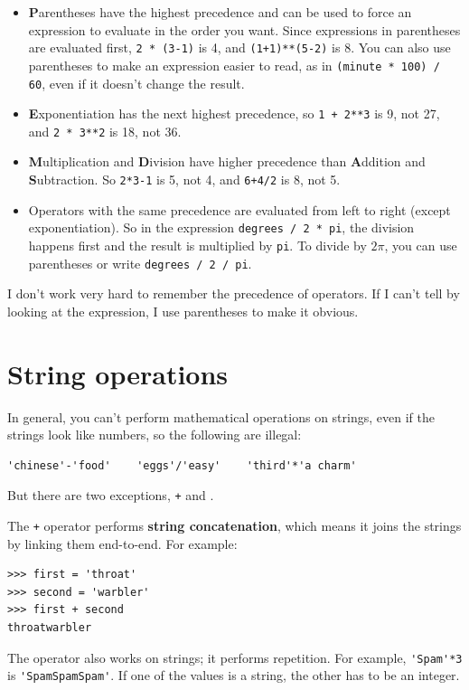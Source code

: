 \documentclass[10pt]{book}
\begin{document}
\begin{itemize}

\item {\bf P}arentheses have the highest precedence and can be used 
to force an expression to evaluate in the order you want. Since
expressions in parentheses are evaluated first, {\tt 2 * (3-1)} is 4,
and {\tt (1+1)**(5-2)} is 8. You can also use parentheses to make an
expression easier to read, as in {\tt (minute * 100) / 60}, even
if it doesn't change the result.

\item {\bf E}xponentiation has the next highest precedence, so
{\tt 1 + 2**3} is 9, not 27, and {\tt 2 * 3**2} is 18, not 36.

\item {\bf M}ultiplication and {\bf D}ivision have higher precedence
  than {\bf A}ddition and {\bf S}ubtraction.  So {\tt 2*3-1} is 5, not
  4, and {\tt 6+4/2} is 8, not 5.

\item Operators with the same precedence are evaluated from left to
  right (except exponentiation).  So in the expression {\tt degrees /
    2 * pi}, the division happens first and the result is multiplied
  by {\tt pi}.  To divide by $2 \pi$, you can use parentheses or write
  {\tt degrees / 2 / pi}.

\end{itemize}

I don't work very hard to remember the precedence of
operators.  If I can't tell by looking at the expression, I use
parentheses to make it obvious.


\section{String operations}

In general, you can't perform mathematical operations on strings, even
if the strings look like numbers, so the following are illegal:

\begin{verbatim}
'chinese'-'food'    'eggs'/'easy'    'third'*'a charm'
\end{verbatim}
%
But there are two exceptions, {\tt +} and {\tt *}.

The {\tt +} operator performs {\bf string concatenation}, which means
it joins the strings by linking them end-to-end.  For example:

\begin{verbatim}
>>> first = 'throat'
>>> second = 'warbler'
>>> first + second
throatwarbler
\end{verbatim}
%
The {\tt *} operator also works on strings; it performs repetition.
For example, \verb"'Spam'*3" is \verb"'SpamSpamSpam'".  If one of the
values is a string, the other has to be an integer.
\end{document}
